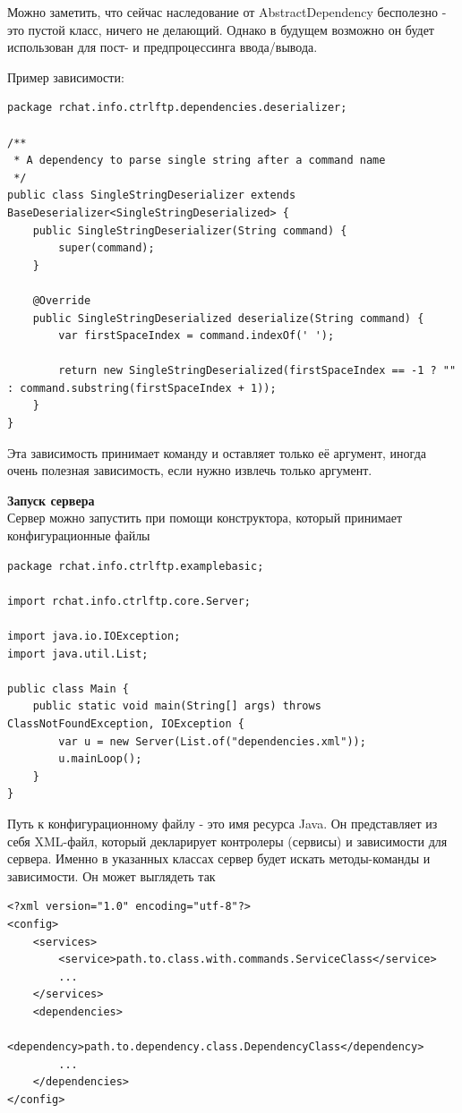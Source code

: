 \documentclass[a4paper,14pt]{extarticle}
\begin{document}
Можно заметить, что сейчас наследование от AbstractDependency бесполезно - это пустой класс, ничего не делающий. 
Однако в будущем возможно он будет использован для пост- и предпроцессинга ввода/вывода.

Пример зависимости:
\begin{verbatim}
package rchat.info.ctrlftp.dependencies.deserializer;

/**
 * A dependency to parse single string after a command name
 */
public class SingleStringDeserializer extends BaseDeserializer<SingleStringDeserialized> {
    public SingleStringDeserializer(String command) {
        super(command);
    }

    @Override
    public SingleStringDeserialized deserialize(String command) {
        var firstSpaceIndex = command.indexOf(' ');

        return new SingleStringDeserialized(firstSpaceIndex == -1 ? "" : command.substring(firstSpaceIndex + 1));
    }
}
\end{verbatim}

Эта зависимость принимает команду и оставляет только её аргумент, иногда очень полезная зависимость, если нужно извлечь
только аргумент.

\textbf{Запуск сервера}\\
Сервер можно запустить при помощи конструктора, который принимает конфигурационные файлы
\begin{verbatim}
package rchat.info.ctrlftp.examplebasic;

import rchat.info.ctrlftp.core.Server;

import java.io.IOException;
import java.util.List;

public class Main {
    public static void main(String[] args) throws ClassNotFoundException, IOException {
        var u = new Server(List.of("dependencies.xml"));
        u.mainLoop();
    }
}
\end{verbatim}

Путь к конфигурационному файлу - это имя ресурса Java. Он представляет из себя XML-файл, который
декларирует контролеры (сервисы) и зависимости для сервера. Именно в указанных классах сервер 
будет искать методы-команды и зависимости. Он может выглядеть так
\begin{verbatim}
<?xml version="1.0" encoding="utf-8"?>
<config>
    <services>
        <service>path.to.class.with.commands.ServiceClass</service>
        ...
    </services>
    <dependencies>
        <dependency>path.to.dependency.class.DependencyClass</dependency>
        ...
    </dependencies>
</config>
\end{verbatim}
\end{document}
